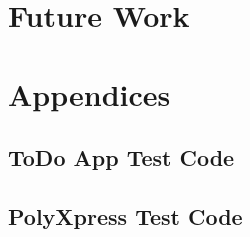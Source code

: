 \documentclass[11pt]{article}
\begin{document}
\section{Future Work}



\section{Appendices}

\subsection{ToDo App Test Code}

\subsection{PolyXpress Test Code}

\newpage





\nocite{*}
\end{document}
